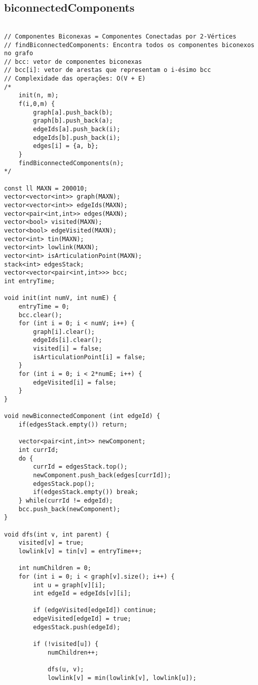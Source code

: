 \documentclass[landscape,twocolumn,10pt,a4paper]{article}
\begin{document}
\subsection{biconnectedComponents}
\begin{verbatim}

// Componentes Biconexas = Componentes Conectadas por 2-Vértices
// findBiconnectedComponents: Encontra todos os componentes biconexos no grafo
// bcc: vetor de componentes biconexas
// bcc[i]: vetor de arestas que representam o i-ésimo bcc
// Complexidade das operações: O(V + E)
/*
    init(n, m);
    f(i,0,m) {
        graph[a].push_back(b);
        graph[b].push_back(a);
        edgeIds[a].push_back(i);
        edgeIds[b].push_back(i);
        edges[i] = {a, b};
    }
    findBiconnectedComponents(n);
*/

const ll MAXN = 200010;
vector<vector<int>> graph(MAXN);
vector<vector<int>> edgeIds(MAXN);
vector<pair<int,int>> edges(MAXN);
vector<bool> visited(MAXN);
vector<bool> edgeVisited(MAXN);
vector<int> tin(MAXN);
vector<int> lowlink(MAXN);
vector<int> isArticulationPoint(MAXN);
stack<int> edgesStack;
vector<vector<pair<int,int>>> bcc;
int entryTime;

void init(int numV, int numE) {
    entryTime = 0;
    bcc.clear();
    for (int i = 0; i < numV; i++) {
        graph[i].clear();
        edgeIds[i].clear();
        visited[i] = false;
        isArticulationPoint[i] = false;
    }
    for (int i = 0; i < 2*numE; i++) {
        edgeVisited[i] = false;
    }
}

void newBiconnectedComponent (int edgeId) {
    if(edgesStack.empty()) return;
    
    vector<pair<int,int>> newComponent;
    int currId;
    do {
        currId = edgesStack.top();
        newComponent.push_back(edges[currId]);
        edgesStack.pop();
        if(edgesStack.empty()) break;
    } while(currId != edgeId);
    bcc.push_back(newComponent);
}

void dfs(int v, int parent) {
    visited[v] = true;
    lowlink[v] = tin[v] = entryTime++;

    int numChildren = 0;
    for (int i = 0; i < graph[v].size(); i++) {
        int u = graph[v][i];
        int edgeId = edgeIds[v][i];

        if (edgeVisited[edgeId]) continue;
        edgeVisited[edgeId] = true;
        edgesStack.push(edgeId);

        if (!visited[u]) {
            numChildren++;

            dfs(u, v);
            lowlink[v] = min(lowlink[v], lowlink[u]);


\end{verbatim}
\end{document}
